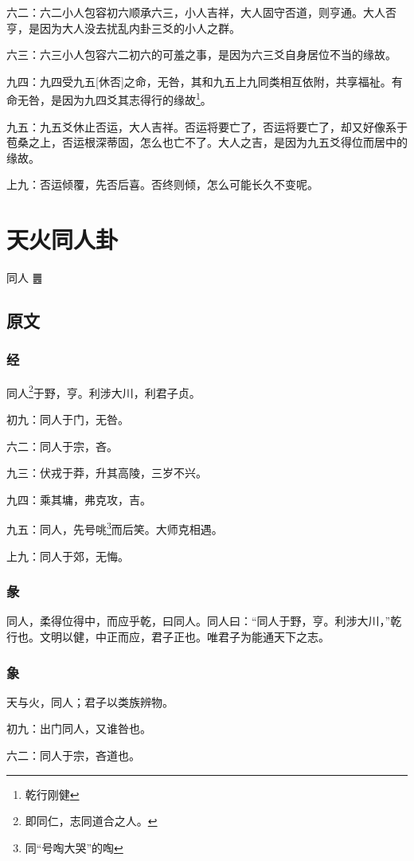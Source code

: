 \documentclass[12pt,oneside]{book}
\begin{document}
六二：六二小人包容初六顺承六三，小人吉祥，大人固守否道，则亨通。大人否亨，是因为大人没去扰乱内卦三爻的小人之群。

六三：六三小人包容六二初六的可羞之事，是因为六三爻自身居位不当的缘故。

九四：九四受九五[休否]之命，无咎，其和九五上九同类相互依附，共享福祉。有命无咎，是因为九四爻其志得行的缘故\footnote{乾行刚健}。

九五：九五爻休止否运，大人吉祥。否运将要亡了，否运将要亡了，却又好像系于苞桑之上，否运根深蒂固，怎么也亡不了。大人之吉，是因为九五爻得位而居中的缘故。

上九：否运倾覆，先否后喜。否终则倾，怎么可能长久不变呢。


\chapter{天火同人卦}
同人 {\Large ䷌}

\section{原文}

\subsection{经}
同人\footnote{即同仁，志同道合之人。}于野，亨。利涉大川，利君子贞。

初九：同人于门，无咎。

六二：同人于宗，吝。

九三：伏戎于莽，升其高陵，三岁不兴。

九四：乘其墉，弗克攻，吉。

九五：同人，先号咷\footnote{同“号啕大哭”的啕}而后笑。大师克相遇。

上九：同人于郊，无悔。

\subsection{彖}
同人，柔得位得中，而应乎乾，曰同人。同人曰：“同人于野，亨。利涉大川，”乾行也。文明以健，中正而应，君子正也。唯君子为能通天下之志。

\subsection{象}
天与火，同人；君子以类族辨物。

初九：出门同人，又谁咎也。

六二：同人于宗，吝道也。
\end{document}
